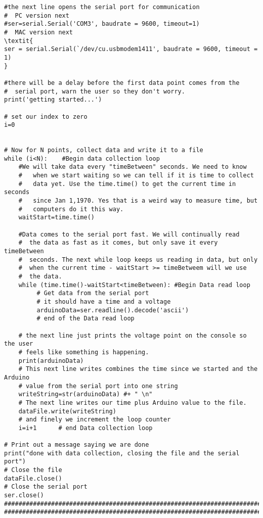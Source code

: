 \begin{verbatim}
#the next line opens the serial port for communication
#  PC version next
#ser=serial.Serial('COM3', baudrate = 9600, timeout=1)
#  MAC version next
\textit{
ser = serial.Serial(`/dev/cu.usbmodem1411', baudrate = 9600, timeout = 1)
}
 
#there will be a delay before the first data point comes from the 
#  serial port, warn the user so they don't worry.
print('getting started...')
 
# set our index to zero
i=0
 
 
# Now for N points, collect data and write it to a file
while (i<N):    #Begin data collection loop
    #We will take data every "timeBetween" seconds. We need to know 
    #   when we start waiting so we can tell if it is time to collect 
    #   data yet. Use the time.time() to get the current time in seconds
    #   since Jan 1,1970. Yes that is a weird way to measure time, but 
    #   computers do it this way.
    waitStart=time.time()
    
    #Data comes to the serial port fast. We will continually read 
    #  the data as fast as it comes, but only save it every timeBetween
    #  seconds. The next while loop keeps us reading in data, but only 
    #  when the current time - waitStart >= timeBetweem will we use 
    #  the data.
    while (time.time()-waitStart<timeBetween): #Begin Data read loop
         # Get data from the serial port
         # it should have a time and a voltage
         arduinoData=ser.readline().decode('ascii')
         # end of the Data read loop
         
    # the next line just prints the voltage point on the console so the user 
    # feels like something is happening.
    print(arduinoData)
    # This next line writes combines the time since we started and the Arduino 
    # value from the serial port into one string
    writeString=str(arduinoData) #+ " \n"
    # The next line writes our time plus Arduino value to the file.
    dataFile.write(writeString)
    # and finely we increment the loop counter
    i=i+1      # end Data collection loop   
    
# Print out a message saying we are done
print("done with data collection, closing the file and the serial port")
# Close the file
dataFile.close()
# Close the serial port   
ser.close() 
###############################################################################
###############################################################################
\end{verbatim}

